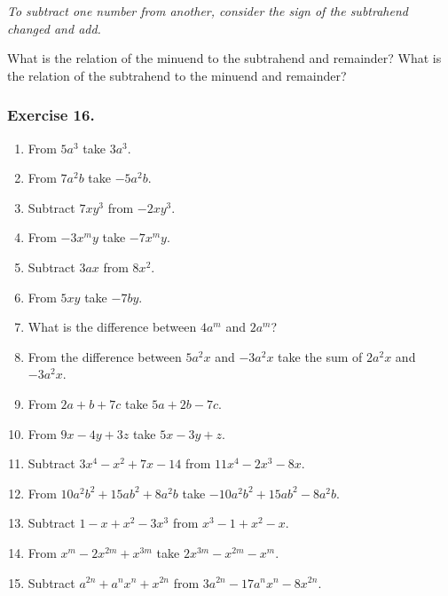 \documentclass{book}
\begin{document}
\textit{To subtract one number from another, consider the sign of
the subtrahend changed and add.}

What is the relation of the minuend to the subtrahend
and remainder? What is the relation of the
subtrahend to the minuend and remainder?

\subsubsection*{Exercise 16.}
\begin{enumerate}
\item From $5a^{3}$ take $3a^{3}$.

\item From $7a^{2}b$ take $-5a^{2}b$.

\item Subtract $7xy^{3}$ from $-2xy^{3}$.

\item From $-3x^{m}y$ take $-7x^{m}y$.

\item Subtract $3ax$ from $8x^{2}$.

\item From $5xy$ take $-7by$.

\item What is the difference between $4a^{m}$ and $2a^{m}$?

\item From the difference between $5a^{2}x$ and $-3a^{2}x$ take
the sum of $2a^{2}x$ and $-3a^{2}x$.

\item From $2a + b + 7c$ take $5a + 2b - 7c$.

\item From $9x - 4y + 3z$ take $5x - 3y + z$.

\item Subtract $3x^{4} - x^{2} + 7x - 14$ from $11x^{4} - 2x^{3} -
8x$.

\item From $10a^{2}b^{2} + 15ab^{2} + 8a^{2}b$ take $-10a^{2}b^{2}
+ 15ab^{2} - 8a^{2}b$.

\item Subtract $1- x + x^{2} - 3x^{3}$ from $x^{3} - 1 + x^{2} -
x$.

\item From $x^{m} - 2x^{2m} + x^{3m}$ take $2x^{3m} - x^{2m} -
x^{m}$.

\item Subtract $a^{2n} + a^{n}x^{n} + x^{2n}$ from $3a^{2n} -
17a^{n}x^{n} - 8x^{2n}$.


\end{enumerate}
\end{document}
